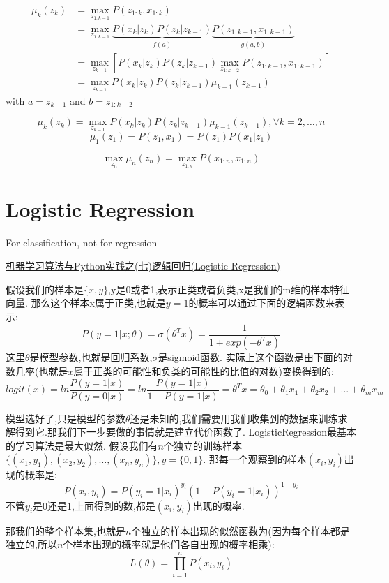 \documentclass{article}
\begin{document}
$$
\begin{aligned}
\mu_k(z_k)
& = \max_{z_{1:k-1}} P(z_{1:k}, x_{1:k}) \\ 
& = \max_{z_{1:k-1}} \underbrace{P(x_k|z_k) P(z_k|z_{k-1})}_{f(a)} \underbrace{P(z_{1:k-1}, x_{1:k-1})}_{g(a,b)} \\ 
& = \max_{z_{k-1}} [P(x_k|z_k) P(z_k|z_{k-1}) \max_{z_{1:k-2}} P(z_{1:k-1}, x_{1:k-1})] \\ 
& = \max_{z_{k-1}} P(x_k|z_k) P(z_k|z_{k-1}) \mu_{k-1}(z_{k-1})
\end{aligned}
$$
with $a = z_{k-1}$ and $b = z_{1:k-2}$

$$ \mu_k(z_k) = \max_{z_{k-1}} P(x_k|z_k) P(z_k|z_{k-1}) \mu_{k-1}(z_{k-1}), \forall k = 2,\ldots,n $$
$$ \mu_1(z_1) = P(z_1, x_1) = P(z_1) P(x_1|z_1)$$

$$
\max_{z_n} \mu_n(z_n)
= \max_{z_{1:n}} P(x_{1:n}, x_{1:n})
$$

\section{Logistic Regression}
For classification, not for regression

\href{http://blog.csdn.net/zouxy09/article/details/20319673}{机器学习算法与Python实践之(七)逻辑回归(Logistic Regression)}

假设我们的样本是$\{x, y\}$,y是0或者1,表示正类或者负类,x是我们的m维的样本特征向量.
那么这个样本x属于正类,也就是$y = 1$的概率可以通过下面的逻辑函数来表示:
$$
P(y = 1| x; \theta) = \sigma(\theta^T x) = \frac{1}{1 + exp(- \theta^T x)}
$$
这里$\theta$是模型参数,也就是回归系数,$\sigma$是sigmoid函数.
实际上这个函数是由下面的对数几率(也就是$x$属于正类的可能性和负类的可能性的比值的对数)变换得到的:
$$
log it(x)
= ln \frac{P(y = 1 | x)}{P(y = 0 | x)}
= ln \frac{P(y = 1 | x)}{1 - P(y = 1 | x)}
= \theta^T x
= \theta_0 + \theta_1 x_1 + \theta_2 x_2 + ... + \theta_m x_m
$$

模型选好了,只是模型的参数$\theta$还是未知的,我们需要用我们收集到的数据来训练求解得到它.那我们下一步要做的事情就是建立代价函数了.
LogisticRegression最基本的学习算法是最大似然.
假设我们有$n$个独立的训练样本$\{(x_1, y_1) ,(x_2, y_2), \ldots ,(x_n, y_n)\},y = \{0, 1\}$.
那每一个观察到的样本$(x_i, y_i)$出现的概率是:
$$
P(x_i, y_i) = P(y_i = 1 | x_i)^{y_i} (1 - P(y_i = 1 | x_i))^{1 - y_i}
$$
不管$y_i$是$0$还是$1$,上面得到的数,都是$(x_i, y_i)$出现的概率.

那我们的整个样本集,也就是$n$个独立的样本出现的似然函数为(因为每个样本都是独立的,所以$n$个样本出现的概率就是他们各自出现的概率相乘):
$$
L(\theta)
= \prod_{i = 1}^{n} P(x_i, y_i)
$$
\end{document}
